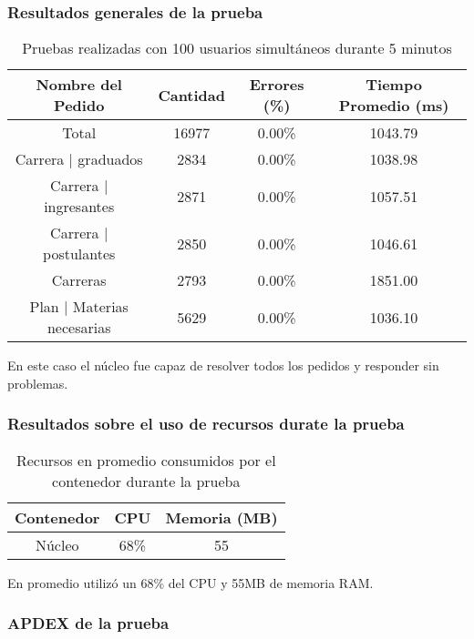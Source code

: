 \subsubsection{Resultados generales de la prueba}
\begin{table}[!htbp]
    \centering
    \makegapedcells
    \begin{tabular}{|c|c|c|c|}
    \hline
    Nombre del Pedido & Cantidad & Errores (\%) & Tiempo Promedio (ms) \\ \hline
    Total & 16977 & 0.00\% & 1043.79\\ \hline
    Carrera | graduados & 2834 & 0.00\% & 1038.98\\ \hline
    Carrera | ingresantes & 2871 & 0.00\% & 1057.51\\ \hline
    Carrera | postulantes & 2850 & 0.00\% & 1046.61\\ \hline
    Carreras & 2793 & 0.00\% & 1851.00\\ \hline
    Plan | Materias necesarias & 5629 & 0.00\% & 1036.10\\ \hline
    
    \end{tabular}
    \caption{Pruebas realizadas con 100 usuarios simultáneos durante 5 minutos}
    \label{tab:tabla_planes}
\end{table}

En este caso el núcleo fue capaz de resolver todos los pedidos y responder sin problemas.

\subsubsection{Resultados sobre el uso de recursos durate la prueba}
\begin{table}[!htbp]
    \centering
    \makegapedcells
    \begin{tabular}{|c|c|c|}
    \hline
    Contenedor & CPU & Memoria (MB)\\ \hline
    Núcleo & 68\% & 55 \\ \hline
    \end{tabular}
    \caption{Recursos en promedio consumidos por el contenedor durante la prueba}
    \label{tab:tabla_planes}
\end{table}

En promedio utilizó un 68\% del CPU y 55MB de memoria RAM.


\subsubsection{APDEX de la prueba}


